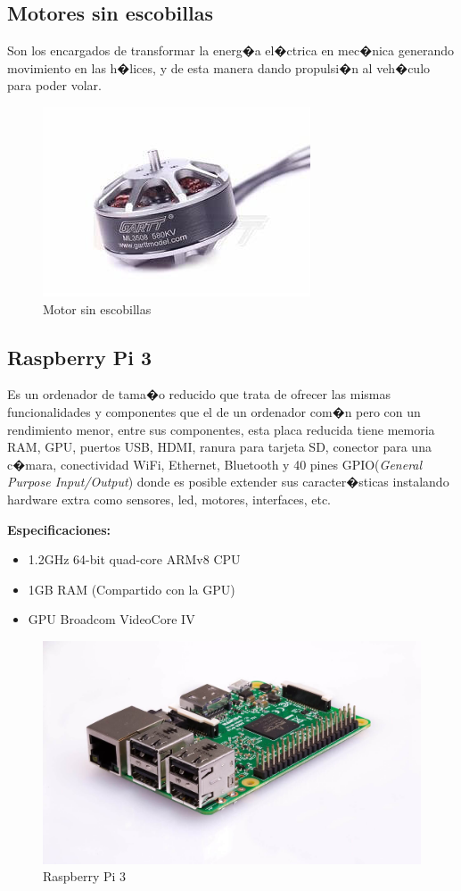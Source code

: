 	\subsection{Motores sin escobillas}
		Son los encargados de transformar la energ�a el�ctrica en mec�nica generando movimiento en las h�lices, y de esta manera dando propulsi�n al veh�culo para poder volar.

		\begin{figure}[h!]
			\centering
			\includegraphics[width=0.4\linewidth, height=0.15\textheight]{Imagenes/motor}
			\caption{Motor sin escobillas}
			\label{fig:motor}
		\end{figure}

	\subsection{Raspberry Pi 3}
		Es un ordenador de tama�o reducido que trata de ofrecer las mismas funcionalidades y componentes que el de un ordenador com�n pero con un rendimiento menor, entre sus componentes, esta placa reducida tiene memoria RAM, GPU, puertos USB, HDMI, ranura para tarjeta SD, conector para una c�mara, conectividad WiFi, Ethernet, Bluetooth y 40 pines GPIO(\textit{General Purpose Input/Output}) donde es posible extender sus caracter�sticas instalando hardware extra como sensores, led, motores, interfaces, etc.\par \textbf{Especificaciones:}
		\begin{itemize}
			
			\item 1.2GHz 64-bit quad-core ARMv8 CPU
			\item 1GB RAM (Compartido con la GPU)
			\item GPU Broadcom VideoCore IV	\newline
		\end{itemize}
		
		\begin{figure}[h!]
			\centering
			\includegraphics[width=0.6\linewidth]{Imagenes/raspberry3}
			\caption{Raspberry Pi 3}
			\label{fig:raspberry3}
		\end{figure}


